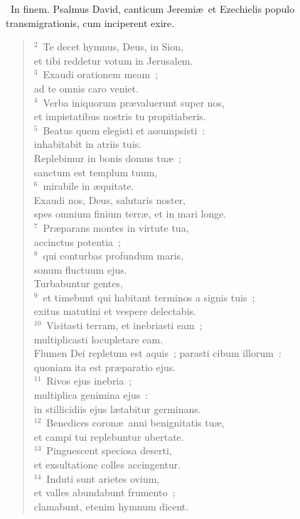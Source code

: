 ~\lettrine[lines=10,image=true,loversize=0.05,lraise=-0.03]{I}{}n finem. Psalmus David, canticum Jeremi\ae\ et Ezechielis populo transmigrationis, cum inciperent exire.
\begin{flushleft}\begin{verse}\vspace{6pt}${}^{2}$~Te decet hymnus, Deus, in Sion,\\ et tibi reddetur votum in Jerusalem.\\
${}^{3}$~Exaudi orationem meam~;\\ ad te omnis caro veniet.\\
${}^{4}$~Verba iniquorum pr\ae valuerunt super nos,\\ et impietatibus nostris tu propitiaberis.\\
${}^{5}$~Beatus quem elegisti et assumpsisti~:\\ inhabitabit in atriis tuis.\\ Replebimur in bonis domus tu\ae~;\\ sanctum est templum tuum,\\
${}^{6}$~mirabile in \ae quitate.\\ Exaudi nos, Deus, salutaris noster,\\ spes omnium finium terr\ae , et in mari longe.\\
${}^{7}$~Pr\ae parans montes in virtute tua,\\ accinctus potentia~;\\
${}^{8}$~qui conturbas profundum maris,\\ sonum fluctuum ejus.\\ Turbabuntur gentes,\\
${}^{9}$~et timebunt qui habitant terminos a signis tuis~;\\ exitus matutini et vespere delectabis.\\
${}^{10}$~Visitasti terram, et inebriasti eam~;\\ multiplicasti locupletare eam.\\ Flumen Dei repletum est aquis~; parasti cibum illorum~:\\ quoniam ita est pr\ae paratio ejus.\\
${}^{11}$~Rivos ejus inebria~;\\ multiplica genimina ejus~:\\ in stillicidiis ejus l\ae tabitur germinans.\\
${}^{12}$~Benedices coron\ae\ anni benignitatis tu\ae ,\\ et campi tui replebuntur ubertate.\\
${}^{13}$~Pinguescent speciosa deserti,\\ et exsultatione colles accingentur.\\
${}^{14}$~Induti sunt arietes ovium,\\ et valles abundabunt frumento~;\\ clamabunt, etenim hymnum dicent.\end{verse}\end{flushleft}



